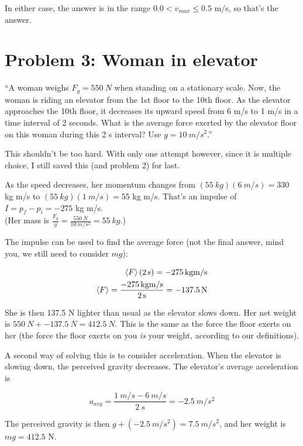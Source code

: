 \documentclass[8.01x]{subfiles}
\begin{document}
In either case, the answer is in the range $0.0 < v_{max} \le 0.5$ m/s, so that's the answer.

\section{Problem 3: Woman in elevator}

``A woman weighs $F_g = \SI{550}{N}$ when standing on a stationary scale. Now, the woman is riding an elevator from the 1st floor to the 10th floor. As the elevator approaches the 10th floor, it decreases its upward speed from 6 m/s to 1 m/s in a time interval of 2 seconds. What is the average force exerted by the elevator floor on this woman during this 2 s interval? Use $g = \SI{10}{m/s^2}$.''

This shouldn't be too hard. With only one attempt however, since it is multiple choice, I still saved this (and problem 2) for last.

As the speed decreases, her momentum changes from $(\SI{55}{kg})(\SI{6}{m/s}) = 330$ kg m/s to $(\SI{55}{kg})(\SI{1}{m/s}) = 55$ kg m/s. That's an impulse of $I = p_f - p_i = -275$ kg m/s.\\
(Her mass is $\displaystyle \frac{F_g}{g} = \frac{\SI{550}{N}}{\SI{10}{m/s^2}} = \SI{55}{kg}$.)

The impulse can be used to find the average force (not the final answer, mind you, we still need to consider $m g$):

\begin{align}
\Braket{F} (\SI{2}{s}) = \SI{-275}{kg m/s}\\
\Braket{F} = \frac{\SI{-275}{kg m/s}}{\SI{2}{s}} = \SI{-137.5}{N}
\end{align}

She is then 137.5 N lighter than usual as the elevator slows down. Her net weight is $\SI{550}{N} + \SI{-137.5}{N} = \SI{412.5}{N}$. This is the same as the force the floor exerts on her (the force the floor exerts on you \emph{is} your weight, according to our definitions).

A second way of solving this is to consider acceleration. When the elevator is slowing down, the perceived gravity decreases. The elevator's average acceleration is

\begin{equation}
a_{avg} = \frac{\SI{1}{m/s} - \SI{6}{m/s}}{\SI{2}{s}} = \SI{-2.5}{m/s^2}
\end{equation}

The perceived gravity is then $g + (\SI{-2.5}{m/s^2}) = \SI{7.5}{m/s^2}$, and her weight is $m g = 412.5$ N.
\end{document}
